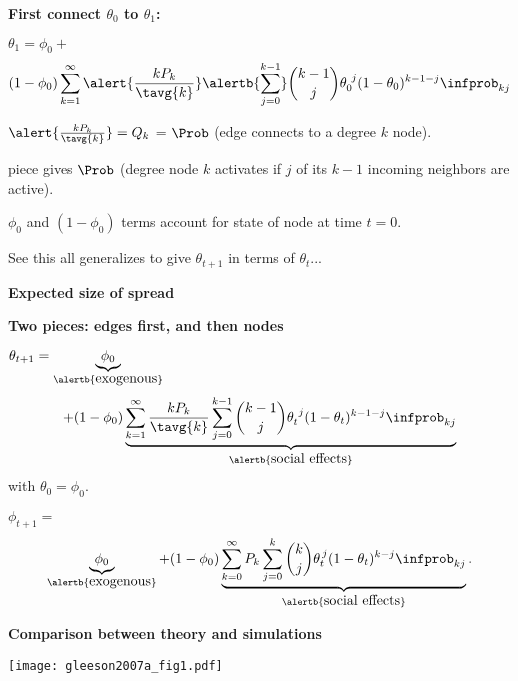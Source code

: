 \begin{frame}[plain]
  \textbf{First connect $\theta_0$ to $\theta_1$:}
    
    
      $
      \theta_{1}
      =
      \phi_0 +
      $
      $$
      (1-\phi_0)
      \sum_{k=1}^{\infty}
      \alert{\frac{k P_k}{\tavg{k}}}
      \alertb{\sum_{j=0}^{k-1}}
      \binom{k-1}{j}
      \theta_{0}^{\ j}
      (1-\theta_{0})^{k-1-j}
      \infprob_{kj}
      $$
    
      $ \alert{\frac{kP_k}{\tavg{k}}} = Q_k$ = $\Prob$ (edge connects to a degree $k$ node).
    
       piece gives $\Prob$ (degree node $k$ activates
      if $j$ of its $k-1$ incoming neighbors are active).
    
      $\phi_0$ and $(1-\phi_0)$ terms account for state of node at time $t=0$.
    
      See this all generalizes to give $\theta_{t+1}$ in terms of $\theta_{t}$...
    
  

  \textbf{Expected size of spread}
  
  \textbf{Two pieces: edges first, and then nodes}
    
    
      $
      \theta_{t+1}
      =
      \underbrace{\phi_0}_{\alertb{\mbox{exogenous}}} 
      $
      $$
      +
      (1-\phi_0)
      \underbrace{
      \sum_{k=1}^{\infty}
      \frac{k P_k}{\tavg{k}}
      \sum_{j=0}^{k-1}
      \binom{k-1}{j}
      \theta_{t}^{\ j}
      (1-\theta_{t})^{k-1-j}
      \infprob_{kj}
      }_{\alertb{\mbox{social effects}}}
      $$
      with $\theta_0 = \phi_0$.
    
      $ 
      \phi_{t+1}
      = 
      $
      $$
      \underbrace{\phi_0}_{\alertb{\mbox{exogenous}}} 
      + 
      (1-\phi_{0})
      \underbrace{
      \sum_{k=0}^{\infty}
      P_k
      \sum_{j=0}^{k}
      \binom{k}{j}
      \theta_t^{\, j}
      (1-\theta_t)^{k-j} 
      \infprob_{kj}
      }_{\alertb{\mbox{social effects}}}.
      $$
    
  




  \textbf{Comparison between theory and simulations}

      
    \texttt{[image: gleeson2007a\_fig1.pdf]}
    

\end{frame}
